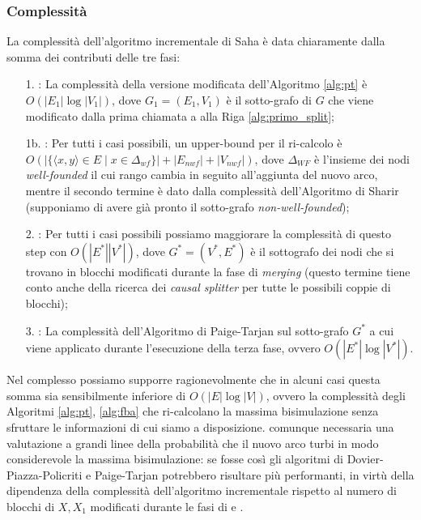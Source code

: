 \subsubsection{Complessità}
La complessità dell'algoritmo incrementale di Saha è data chiaramente dalla somma dei contributi delle tre fasi:
\begin{enumerate}
    \item[1.] \splitfunc: La complessità della versione modificata dell'Algoritmo \ref{alg:pt} è $O(|E_1|\log |V_1|)$, dove $G_1=(E_1, V_1)$ è il sotto-grafo di $G$ che viene modificato dalla prima chiamata a \splitfunc alla Riga \ref{alg:primo_split};
    \item[1b.] \rankfunc: Per tutti i casi possibili, un upper-bound per il ri-calcolo è $O(|\{\langle x,y\rangle \in E \mid x \in \Delta_{wf}\}| + |E_{nwf}| + |V_{nwf}|)$, dove $\Delta_{WF}$ è l'insieme dei nodi \emph{well-founded} il cui rango cambia in seguito all'aggiunta del nuovo arco, mentre il secondo termine è dato dalla complessità dell'Algoritmo di Sharir \cite{sharir} (supponiamo di avere già pronto il sotto-grafo \emph{non-well-founded});
    \item[2.] : Per tutti i casi possibili possiamo maggiorare la complessità di questo step con $O(|E^*||V^*|)$, dove $G^*=(V^*,E^*)$ è il sottografo dei nodi che si trovano in blocchi modificati durante la fase di \emph{merging} (questo termine tiene conto anche della ricerca dei \emph{causal splitter} per tutte le possibili coppie di blocchi);
    \item[3.] \splitfunc: La complessità dell'Algoritmo di Paige-Tarjan sul sotto-grafo $G^*$ a cui viene applicato durante l'esecuzione della terza fase, ovvero $O(|E^*| \log |V^*|)$.
\end{enumerate}

Nel complesso possiamo supporre ragionevolmente che in alcuni casi questa somma sia sensibilmente inferiore di $O(|E| \log |V|)$, ovvero la complessità degli Algoritmi \ref{alg:pt}, \ref{alg:fba} che ri-calcolano la massima bisimulazione senza sfruttare le informazioni di cui siamo a disposizione. \accente comunque necessaria una valutazione a grandi linee della probabilità che il nuovo arco turbi in modo considerevole la massima bisimulazione: se fosse così gli algoritmi di Dovier-Piazza-Policriti e Paige-Tarjan potrebbero risultare più performanti, in virtù della dipendenza della complessità dell'algoritmo incrementale rispetto al numero di blocchi di $X, X_1$ modificati durante le fasi di \splitfunc e .
